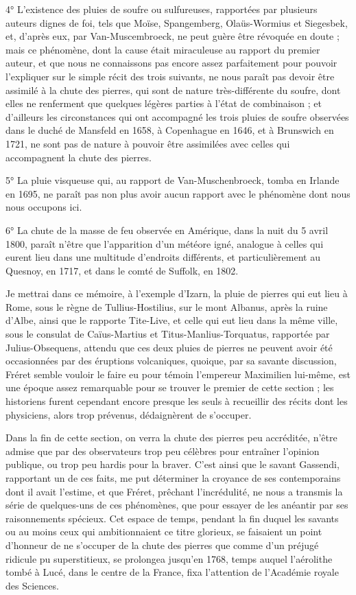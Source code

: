 \documentclass[a4paper, 12pt, oneside, french]{article}
\begin{document}
4° L'existence des pluies de soufre ou sulfureuses, rapportées par plusieurs auteurs dignes de foi, tels que Moïse, Spangemberg, Olaüs-Wormius et Siegesbek, et, d'après eux, par Van-Muscembroeck, ne peut guère être révoquée en doute ; mais ce phénomène, dont la cause était miraculeuse au rapport du premier auteur, et que nous ne connaissons pas encore assez parfaitement pour pouvoir l'expliquer sur le simple récit des trois suivants, ne nous paraît pas devoir être assimilé à la chute des pierres, qui sont de nature très-différente du soufre, dont elles ne renferment que quelques légères parties à l'état de combinaison ; et d'ailleurs les circonstances qui ont accompagné les trois pluies de soufre observées dans le duché de Mansfeld en 1658, à Copenhague en 1646, et à Brunswich en 1721, ne sont pas de nature à pouvoir être assimilées avec celles qui accompagnent la chute des pierres.

5° La pluie visqueuse qui, au rapport de Van-Muschenbroeck, tomba en Irlande en 1695, ne paraît pas non plus avoir aucun rapport avec le phénomène dont nous nous occupons ici.

6° La chute de la masse de feu observée en Amérique, dans la nuit du 5 avril 1800, paraît n'être que l'apparition d'un météore igné, analogue à celles qui eurent lieu dans une multitude d'endroits différents, et particulièrement au Quesnoy, en 1717, et dans le comté de Suffolk, en 1802.

Je mettrai dans ce mémoire, à l'exemple d'Izarn, la pluie de pierres qui eut lieu à Rome, sous le règne de Tullius-Hostilius, sur le mont Albanus, après la ruine d'Albe, ainsi que le rapporte Tite-Live, et celle qui eut lieu dans la même ville, sous le consulat de Caïus-Martius et Titus-Manlius-Torquatus, rapportée par Julius-Obsequens, attendu que ces deux pluies de pierres ne peuvent avoir été occasionnées par des éruptions volcaniques, quoique, par sa savante discussion, Fréret semble vouloir le faire eu pour témoin l'empereur Maximilien lui-même, est une époque assez remarquable pour se trouver le premier de cette section ; les historiens furent cependant encore presque les seuls à recueillir des récits dont les physiciens, alors trop prévenus, dédaignèrent de s'occuper.

Dans la fin de cette section, on verra la chute des pierres peu accréditée, n'être admise que par des observateurs trop peu célèbres pour entraîner l'opinion publique, ou trop peu hardis pour la braver. C'est ainsi que le savant Gassendi, rapportant un de ces faits, me put déterminer la croyance de ses contemporains dont il avait l'estime, et que Fréret, prêchant l'incrédulité, ne nous a transmis la série de quelques-uns de ces phénomènes, que pour essayer de les anéantir par ses raisonnements spécieux. Cet espace de temps, pendant la fin duquel les savants ou au moins ceux qui ambitionnaient ce titre glorieux, se faisaient un point d'honneur de ne s'occuper de la chute des pierres que comme d'un préjugé ridicule pu superstitieux, se prolongea jusqu'en 1768, temps auquel l'aérolithe tombé à Lucé, dans le centre de la France, fixa l'attention de l'Académie royale des Sciences.
\end{document}
